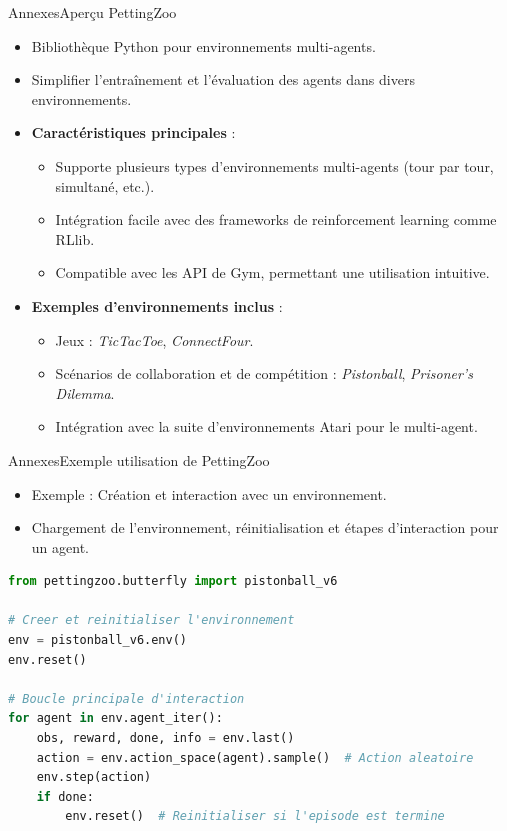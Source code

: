 \begin{frame}{Annexes}{Aperçu PettingZoo}
    \begin{itemize}
        \item Bibliothèque Python pour environnements multi-agents.
        \item Simplifier l'entraînement et l'évaluation des agents dans divers environnements.
        \item \textbf{Caractéristiques principales} :
        \begin{itemize}
            \item Supporte plusieurs types d'environnements multi-agents (tour par tour, simultané, etc.).
            \item Intégration facile avec des frameworks de reinforcement learning comme RLlib.
            \item Compatible avec les API de Gym, permettant une utilisation intuitive.
        \end{itemize}
        \item \textbf{Exemples d'environnements inclus} :
        \begin{itemize}
            \item Jeux : \textit{TicTacToe}, \textit{ConnectFour}.
            \item Scénarios de collaboration et de compétition : \textit{Pistonball}, \textit{Prisoner's Dilemma}.
            \item Intégration avec la suite d'environnements Atari pour le multi-agent.
        \end{itemize}
    \end{itemize}
\end{frame}

\begin{frame}[fragile]{Annexes}{Exemple utilisation de PettingZoo}
    \begin{itemize}
        \item Exemple : Création et interaction avec un environnement.
        \item Chargement de l'environnement, réinitialisation et étapes d'interaction pour un agent.
    \end{itemize}
    \vspace{0.3cm}
    \begin{lstlisting}[language=Python, basicstyle=\ttfamily\small]
from pettingzoo.butterfly import pistonball_v6

# Creer et reinitialiser l'environnement
env = pistonball_v6.env()
env.reset()

# Boucle principale d'interaction
for agent in env.agent_iter():
    obs, reward, done, info = env.last()
    action = env.action_space(agent).sample()  # Action aleatoire
    env.step(action)
    if done:
        env.reset()  # Reinitialiser si l'episode est termine
\end{lstlisting}
\end{frame}


